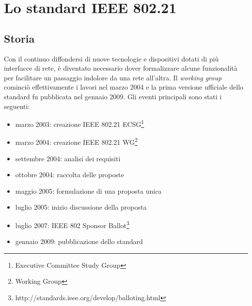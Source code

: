 \chapter{Lo standard IEEE 802.21}

\section{Storia}
Con il continuo diffondersi di nuove tecnologie e dispositivi dotati di più interfacce di rete, è diventato necessario dover formalizzare alcune funzionalità per facilitare un passaggio indolore da una rete all'altra.
Il {\em working group} cominciò effettivamente i lavori nel marzo 2004 e la prima versione ufficiale dello standard fu pubblicata nel gennaio 2009. Gli eventi principali sono stati i seguenti:
\begin{itemize}
\item marzo 2003: creazione IEEE 802.21 ECSG\footnote{Executive Committee Study Group}
\item marzo 2004: creazione IEEE 802.21 WG\footnote{Working Group}
\item settembre 2004: analisi dei requisiti
\item ottobre 2004: raccolta delle proposte
\item maggio 2005: formulazione di una proposta unica
\item luglio 2005: inizio discussione della proposta
\item luglio 2007: IEEE 802 Sponsor Ballot\footnote{http://standards.ieee.org/develop/balloting.html}
\item gennaio 2009: pubblicazione dello standard
\end{itemize}

